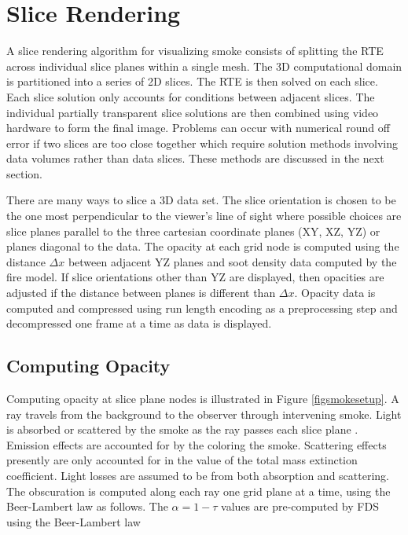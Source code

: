 {\section{Slice Rendering}
A slice rendering algorithm for visualizing smoke consists of splitting the RTE across individual slice planes within a single mesh.  The 3D computational domain is partitioned into a series of 2D slices.  The RTE is then solved on each slice.  Each slice solution only accounts for conditions between adjacent slices.  The individual partially transparent slice solutions are then combined using video hardware to form the final image.   Problems can occur with numerical round off error if two slices are too close together which require solution methods  involving data volumes rather than data slices. These methods are discussed in the next section.

There are many ways to slice a 3D data set.  The slice orientation is chosen to be the one most perpendicular to the viewer's line of sight where possible choices are slice planes parallel to the three cartesian coordinate planes (XY, XZ, YZ) or planes diagonal to the data.  The opacity at each grid node is computed using the distance $\Delta x$ between adjacent YZ planes and soot density data computed by the fire model.  If slice orientations other than YZ are displayed, then opacities are adjusted if the distance between planes is different than $\Delta x$.  Opacity data is computed and compressed using run length encoding as a preprocessing step and decompressed one frame at a time as data is displayed.


\subsection{Computing Opacity}
Computing opacity at slice plane nodes is illustrated in Figure \ref{figsmokesetup}. A ray travels from the background to the observer through intervening smoke. Light is absorbed or scattered by the smoke as the ray passes each slice plane .  Emission effects are accounted for by the coloring the smoke.  Scattering effects presently are only accounted for in the value of the total mass extinction coefficient.  Light losses are assumed to be from both absorption and scattering. The obscuration is computed along each ray one grid plane at a time, using the Beer-Lambert law as follows.  The $\alpha=1-\tau$ values are pre-computed by FDS using the Beer-Lambert law~\cite{Siegel:2001}

}
